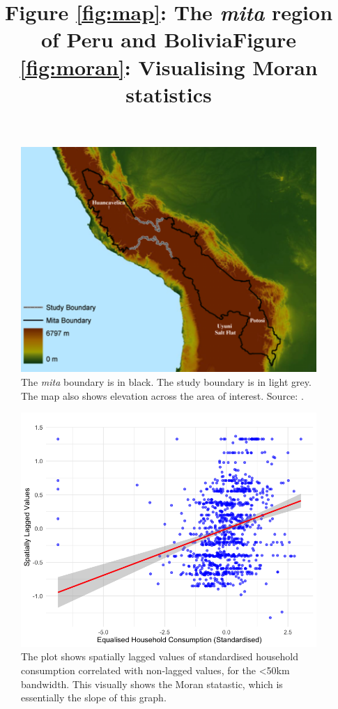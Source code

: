 \documentclass[12pt]{article}
\begin{document}
\begin{figure}[H] 
\centering
\title{Figure \ref{fig:map}: The \emph{mita} region of Peru and Bolivia}\par\medskip
\includegraphics[width=1\linewidth]{figures/fig1_map.png}
\caption{\label{fig:map}The \emph{mita} boundary is in black. The study boundary is in light grey. The map also shows elevation across the area of interest. Source: \autocite{Dell2010Mita}.}
\end{figure}


\begin{figure}[H]
\centering
\title{Figure \ref{fig:moran}: Visualising Moran statistics}\par\medskip
\includegraphics[width=1\linewidth]{figures/moran.png}
\caption{The plot shows spatially lagged values of standardised household consumption correlated with non-lagged values, for the \textless 50km bandwidth. This visually shows the Moran statastic, which is essentially the slope of this graph.}
\label{fig:moran}
\end{figure}


\pagebreak
\printbibliography 
\end{document}
